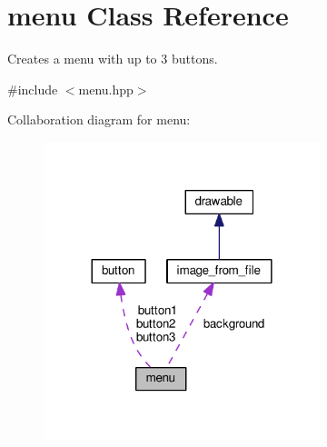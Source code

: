 \hypertarget{classmenu}{}\section{menu Class Reference}
\label{classmenu}


Creates a menu with up to 3 buttons.  




{\ttfamily \#include $<$menu.\+hpp$>$}



Collaboration diagram for menu\+:
\nopagebreak
\begin{figure}[H]
\begin{center}
\leavevmode
\includegraphics[width=228pt]{classmenu__coll__graph}
\end{center}
\end{figure}
